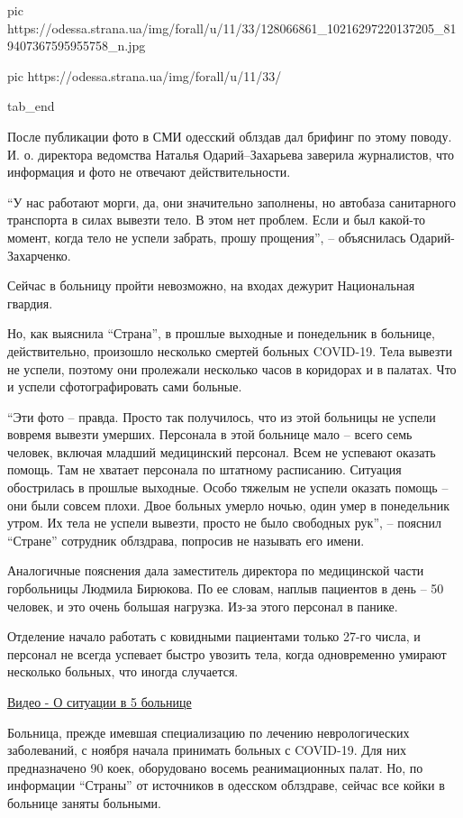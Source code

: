 pic https://odessa.strana.ua/img/forall/u/11/33/128066861_10216297220137205_819407367595955758_n.jpg

pic https://odessa.strana.ua/img/forall/u/11/33/%

tab_end
\fi

После публикации фото в СМИ одесский облздав дал брифинг по этому поводу. И. о.
директора ведомства Наталья Одарий–Захарьева заверила журналистов, что
информация и фото не отвечают действительности.

\enquote{У нас работают морги, да, они значительно заполнены, но автобаза санитарного
транспорта в силах вывезти тело. В этом нет проблем. Если и был какой-то
момент, когда тело не успели забрать, прошу прощения}, – объяснилась
Одарий-Захарченко.

Сейчас в больницу пройти невозможно, на входах дежурит Национальная гвардия.

Но, как выяснила \enquote{Страна}, в прошлые выходные и понедельник в больнице,
действительно, произошло несколько смертей больных COVID-19. Тела вывезти не
успели, поэтому они пролежали несколько часов в коридорах и в палатах. Что и
успели сфотографировать сами больные.

\enquote{Эти фото – правда. Просто так получилось, что из этой больницы не
успели вовремя вывезти умерших. Персонала в этой больнице мало – всего семь
человек, включая младший медицинский персонал. Всем не успевают оказать помощь.
Там не хватает персонала по штатному расписанию. Ситуация обострилась в прошлые
выходные. Особо тяжелым не успели оказать помощь – они были совсем плохи. Двое
больных умерло ночью, один умер в понедельник утром. Их тела не успели вывезти,
просто не было свободных рук}, – пояснил \enquote{Стране} сотрудник облздрава,
попросив не называть его имени.

Аналогичные пояснения дала заместитель директора по медицинской части
горбольницы Людмила Бирюкова. По ее словам, наплыв пациентов в день – 50
человек, и это очень большая нагрузка. Из-за этого персонал в панике.

Отделение начало работать с ковидными пациентами только 27-го числа, и персонал
не всегда успевает быстро увозить тела, когда одновременно умирают несколько
больных, что иногда случается.

\href{https://youtu.be/wDFuU0nTUCg}{Видео - О ситуации в 5 больнице}

Больница, прежде имевшая специализацию по лечению неврологических заболеваний,
с ноября начала принимать больных с COVID-19. Для них предназначено 90 коек,
оборудовано восемь реанимационных палат. Но, по информации \enquote{Страны} от
источников в одесском облздраве, сейчас все койки в больнице заняты больными.


